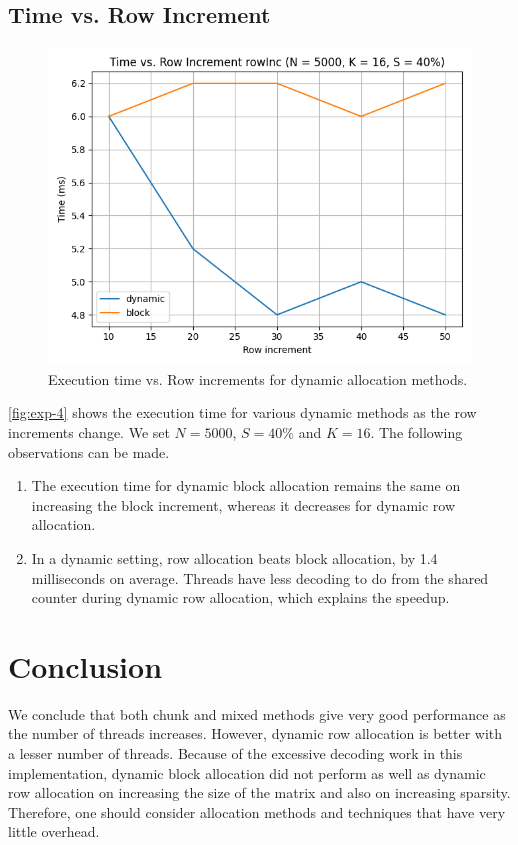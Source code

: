 \documentclass[conference,compsoc]{IEEEtran}
\begin{document}
\subsection{Time vs. Row Increment}
\label{subsec:exp4}

\begin{figure}[!ht]
    \includegraphics[width=\columnwidth]{images/exp4.png}
    \caption{Execution time vs. Row increments for dynamic allocation methods.}
    \label{fig:exp-4}
\end{figure}

\autoref{fig:exp-4} shows the execution time for various dynamic methods as the
row increments change. We set \(N = 5000\), \(S = 40\%\) and \(K = 16\). The
following observations can be made.

\begin{enumerate}
    \item The execution time for dynamic block allocation remains the same on
    increasing the block increment, whereas it decreases for dynamic row
    allocation.
    \item In a dynamic setting, row allocation beats block allocation, by 1.4
    milliseconds on average. Threads have less decoding to do from the shared
    counter during dynamic row allocation, which explains the speedup.
\end{enumerate}

\section{Conclusion}
\label{sec:conclusion}

We conclude that both chunk and mixed methods give very good performance as the
number of threads increases. However, dynamic row allocation is better with a
lesser number of threads. Because of the excessive decoding work in this
implementation, dynamic block allocation did not perform as well as dynamic row
allocation on increasing the size of the matrix and also on increasing sparsity.
Therefore, one should consider allocation methods and techniques that have very
little overhead.
\end{document}
